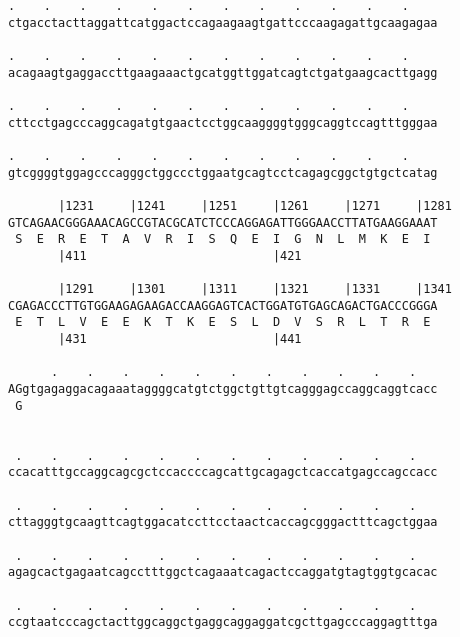\documentclass{article}
\begin{document}
\begin{Verbatim}
.    .    .    .    .    .    .    .    .    .    .    .    
ctgacctacttaggattcatggactccagaagaagtgattcccaagagattgcaagagaa
                                                            
.    .    .    .    .    .    .    .    .    .    .    .    
acagaagtgaggaccttgaagaaactgcatggttggatcagtctgatgaagcacttgagg
                                                            
.    .    .    .    .    .    .    .    .    .    .    .    
cttcctgagcccaggcagatgtgaactcctggcaaggggtgggcaggtccagtttgggaa
                                                            
.    .    .    .    .    .    .    .    .    .    .    .    
gtcggggtggagcccagggctggccctggaatgcagtcctcagagcggctgtgctcatag
                                                            
       |1231     |1241     |1251     |1261     |1271     |1281
GTCAGAACGGGAAACAGCCGTACGCATCTCCCAGGAGATTGGGAACCTTATGAAGGAAAT
 S  E  R  E  T  A  V  R  I  S  Q  E  I  G  N  L  M  K  E  I 
       |411                          |421                   
  
       |1291     |1301     |1311     |1321     |1331     |1341
CGAGACCCTTGTGGAAGAGAAGACCAAGGAGTCACTGGATGTGAGCAGACTGACCCGGGA
 E  T  L  V  E  E  K  T  K  E  S  L  D  V  S  R  L  T  R  E 
       |431                          |441                   
  
      .    .    .    .    .    .    .    .    .    .    .   
AGgtgagaggacagaaataggggcatgtctggctgttgtcagggagccaggcaggtcacc
 G                                                          
                                                            
  
 .    .    .    .    .    .    .    .    .    .    .    .   
ccacatttgccaggcagcgctccaccccagcattgcagagctcaccatgagccagccacc
                                                            
 .    .    .    .    .    .    .    .    .    .    .    .   
cttagggtgcaagttcagtggacatccttcctaactcaccagcgggactttcagctggaa
                                                            
 .    .    .    .    .    .    .    .    .    .    .    .   
agagcactgagaatcagcctttggctcagaaatcagactccaggatgtagtggtgcacac
                                                            
 .    .    .    .    .    .    .    .    .    .    .    .   
ccgtaatcccagctacttggcaggctgaggcaggaggatcgcttgagcccaggagtttga
                                                            

\end{Verbatim}
\end{document}
